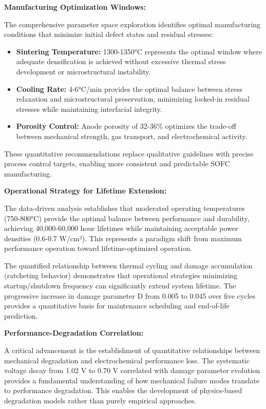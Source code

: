 \documentclass[conference]{IEEEtran}
\begin{document}
\textbf{Manufacturing Optimization Windows:}

The comprehensive parameter space exploration identifies optimal manufacturing conditions that minimize initial defect states and residual stresses:

\begin{itemize}
\item \textbf{Sintering Temperature:} 1300-1350°C represents the optimal window where adequate densification is achieved without excessive thermal stress development or microstructural instability.
\item \textbf{Cooling Rate:} 4-6°C/min provides the optimal balance between stress relaxation and microstructural preservation, minimizing locked-in residual stresses while maintaining interfacial integrity.
\item \textbf{Porosity Control:} Anode porosity of 32-36\% optimizes the trade-off between mechanical strength, gas transport, and electrochemical activity.
\end{itemize}

These quantitative recommendations replace qualitative guidelines with precise process control targets, enabling more consistent and predictable SOFC manufacturing.

\textbf{Operational Strategy for Lifetime Extension:}

The data-driven analysis establishes that moderated operating temperatures (750-800°C) provide the optimal balance between performance and durability, achieving 40,000-60,000 hour lifetimes while maintaining acceptable power densities (0.6-0.7 W/cm²). This represents a paradigm shift from maximum performance operation toward lifetime-optimized operation.

The quantified relationship between thermal cycling and damage accumulation (ratcheting behavior) demonstrates that operational strategies minimizing startup/shutdown frequency can significantly extend system lifetime. The progressive increase in damage parameter D from 0.005 to 0.045 over five cycles provides a quantitative basis for maintenance scheduling and end-of-life prediction.

\textbf{Performance-Degradation Correlation:}

A critical advancement is the establishment of quantitative relationships between mechanical degradation and electrochemical performance loss. The systematic voltage decay from 1.02 V to 0.70 V correlated with damage parameter evolution provides a fundamental understanding of how mechanical failure modes translate to performance degradation. This enables the development of physics-based degradation models rather than purely empirical approaches.
\end{document}
